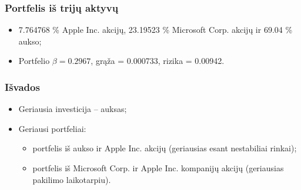 \documentclass[utf8,hyperref={unicode},xcolor=dvipsnames]{beamer}
\theoremstyle{change}\newtheorem{teorema}{Teiginys}
\theoremstyle{change}\newtheorem{salyga}{}
\newcommand{\HH}{\mathrm{H}} %
\newcommand{\Hao}{\HH_{\alpha}^o}
\begin{document}
\begin{frame}
    \frametitle{Portfelis iš trijų aktyvų}
    \begin{itemize}
	\item 7.764768 \% Apple Inc. akcijų, 23.19523 \% Microsoft Corp. akcijų ir
69.04 \% aukso;
	\item Portfelio $\beta= 0.2967$, grąža = 0.000733, rizika = 0.00942.
    \end{itemize}
\end{frame}

\begin{frame}
    \frametitle{Išvados} 

    \begin{itemize}
\item Geriausia investicija  -- auksas;

\item Geriausi portfeliai: 
\begin{itemize}
	\item portfelis iš aukso ir Apple Inc. akcijų (geriausias esant nestabiliai rinkai);
	\item portfelis iš Microsoft Corp. ir Apple Inc. kompanijų akcijų (geriausias pakilimo laikotarpiu).
\end{itemize}
    \end{itemize}

\end{frame}



 
\end{document}
